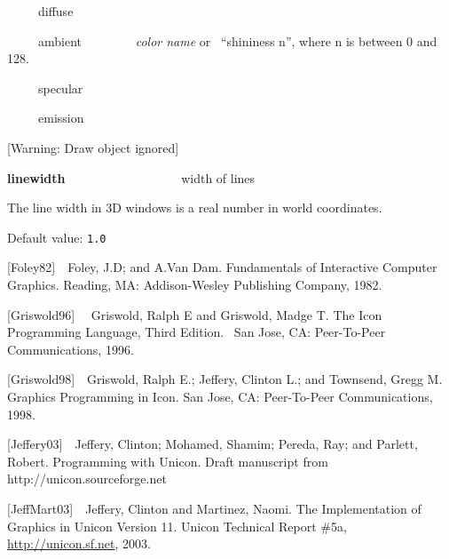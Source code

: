 \documentclass[letterpaper]{article}
\begin{document}
{
\ \ \ \ \ diffuse}

{
\ \ \ \ \ ambient \ \ \ \ \ \ \ \ \textsf{\textit{color name}} or \ \textsf{{}``shininess n''}, where n is between 0 and
128. }

{
\ \ \ \ \ specular\ \ }

{
\ \ \ \ \ emission}


\bigskip

{
[Warning: Draw object ignored] }

{
\textsf{\textbf{linewidth}} \ \ \ \ \ \ \ \ \ \ \ \ \ \ \ \ \ \ width of lines}


\bigskip

{
The line width in 3D windows is a real number in world coordinates.}


\bigskip

{
Default value: \texttt{1.0}}


\bigskip



\bigskip

{
[Foley82]\ \ Foley, J.D; and A.Van Dam. Fundamentals of Interactive Computer Graphics. Reading, MA: Addison-Wesley
Publishing Company, 1982. }


\bigskip

{
[Griswold96] \ \ Griswold, Ralph E and Griswold, Madge T. The Icon Programming Language, Third Edition. \ San Jose, CA:
Peer-To-Peer Communications, 1996. }


\bigskip

{
[Griswold98]\ \ Griswold, Ralph E.; Jeffery, Clinton L.; and Townsend, Gregg M. Graphics Programming in Icon. San Jose,
CA: Peer-To-Peer Communications, 1998. }


\bigskip

{
[Jeffery03]\ \ Jeffery, Clinton; Mohamed, Shamim; Pereda, Ray; and Parlett, Robert. Programming with Unicon. Draft
manuscript from http://unicon.sourceforge.net}


\bigskip

{
[JeffMart03]\ \ Jeffery, Clinton and Martinez, Naomi. The Implementation of Graphics in Unicon Version 11. Unicon
Technical Report \#5a, \href{http://unicon.sf.net/}{http://unicon.sf.net}, 2003.}
\end{document}
